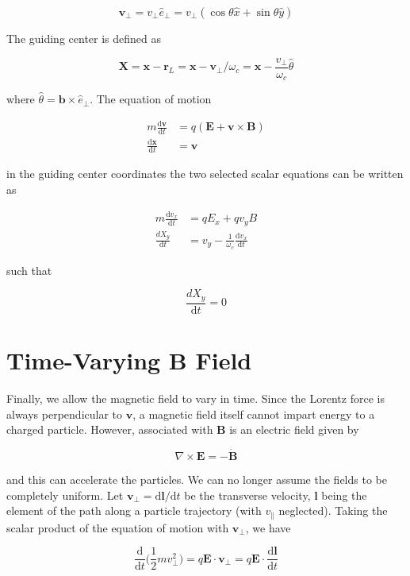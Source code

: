 \documentclass[
  notoc %
]{tufte-book}
\begin{document}
\[
\mathbf{v}_\perp = v_\perp\hat{e}_\perp = v_\perp(\cos\theta\hat{x}+\sin\theta\hat{y})
\]

The guiding center is defined as

\[
\mathbf{X} = \mathbf{x} - \mathbf{r}_L = \mathbf{x} - \mathbf{v}_\perp / \omega_c = \mathbf{x} - \frac{v_\perp}{\omega_c}\hat{\theta}
\]

where \(\hat{\theta} = \mathbf{b}\times\hat{e}_\perp\). The equation of
motion

\[
\begin{aligned}
m\frac{\mathrm{d}\mathbf{v}}{\mathrm{d}t} &= q(\mathbf{E} +\mathbf{v}\times\mathbf{B}) \\
\frac{\mathrm{d}\mathbf{x}}{\mathrm{d}t} &= \mathbf{v}
\end{aligned}
\]

in the guiding center coordinates the two selected scalar equations can
be written as

\[
\begin{aligned}
m\frac{\mathrm{d}v_x}{\mathrm{d}t} &= qE_x + qv_yB \\
\frac{dX_y}{\mathrm{d}t} &= v_y - \frac{1}{\omega_c}\frac{\mathrm{d}v_x}{\mathrm{d}t}
\end{aligned}
\]

such that

\[
\frac{dX_y}{\mathrm{d}t} = 0
\]

\hypertarget{time-varying-b-field}{%
\section{Time-Varying B Field}\label{time-varying-b-field}}

Finally, we allow the magnetic field to vary in time. Since the Lorentz
force is always perpendicular to \(\mathbf{v}\), a magnetic field itself
cannot impart energy to a charged particle. However, associated with
\(\mathbf{B}\) is an electric field given by

\[
\nabla\times\mathbf{E} = -\dot{\mathbf{B}}
\]

and this can accelerate the particles. We can no longer assume the
fields to be completely uniform. Let
\(\mathbf{v}_\perp = \mathrm{d}\mathbf{l}/\mathrm{d}t\) be the
transverse velocity, \(\mathbf{l}\) being the element of the path along
a particle trajectory (with \(v_\parallel\) neglected). Taking the
scalar product of the equation of motion with \(\mathbf{v}_\perp\), we
have

\[
\frac{\mathrm{d}}{\mathrm{d}t}\Big( \frac{1}{2}mv_\perp^2 \Big) = q\mathbf{E}\cdot\mathbf{v}_\perp = q\mathbf{E}\cdot\frac{\mathrm{d}\mathbf{l}}{\mathrm{d}t}
\]
\end{document}
